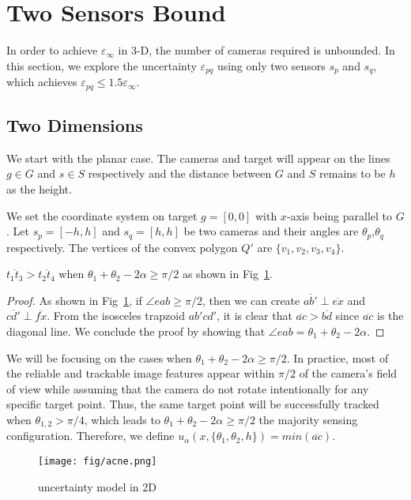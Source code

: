 \section{Two Sensors Bound}
In order to achieve $\varepsilon_\infty$ in 3-D, the number of cameras required is unbounded. 
In this section, we explore the uncertainty $\varepsilon_{pq}$ using only two sensors $s_p$ and $s_q$, which achieves $\varepsilon_{pq} \leq 1.5 \varepsilon_\infty$.

\subsection{Two Dimensions}
We start with the planar case. The cameras and target will appear on the lines $g \in G$ and $s \in S$ respectively and the distance between $G$ and $S$ remains to be $h$ as the height.

We set the coordinate system on target $g = [0,0]$ with $x$-axis being parallel to $G$. Let $s_p = [-h,h]$ and $s_q = [h,h]$ be two cameras and their angles are $\theta_p$,$\theta_q$ respectively. The vertices of the convex polygon $Q'$ are $\{v_1,v_2,v_3,v_4\}$. 

\begin{lemma}\label{lem:angle2d}
$\overline{t_1t_3} > \overline{t_2t_4}$ when $\theta_1 + \theta_2 - 2\alpha \geqslant \pi/2$ as shown in Fig~\ref{fig:acbd}. 
\end{lemma}

\begin{proof}
As shown in Fig~\ref{fig:acbd}, if $\angle eab \geqslant \pi/2$, then we can create $\overline{ab'} \perp \overline{ex}$ and $\overline{cd'} \perp \overline{fx}$. From the isosceles trapzoid $ab'cd'$, it is clear that $\overline{ac} > \overline{bd}$ since $\overline{ac}$ is the diagonal line. We conclude the proof by showing that $\angle eab = \theta_1+\theta_2-2\alpha$. 
\end{proof}
We will be focusing on the cases when $\theta_1 + \theta_2 -2\alpha \geqslant \pi/2$.
In practice, most of the reliable and trackable image features appear within $\pi/2$ of the camera's field of view while assuming that the camera do not rotate intentionally for any specific target point. Thus, the same target point will be successfully tracked when $\theta_{1,2} > \pi/4$, which leads to $\theta_1+ \theta_2-2\alpha \geqslant \pi/2$ the majority sensing configuration.     
Therefore, we define $u_\alpha(x,\{\theta_1, \theta_2, h \}) = min(\overline{ac})$. 

\begin{figure}[h]
\centering
	\texttt{[image: fig/acne.png]}
	\caption{uncertainty model in 2D}
	\label{fig:acbd}
\end{figure} 

